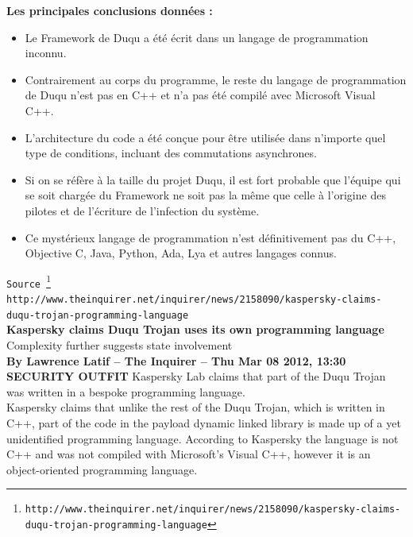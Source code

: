 \documentclass[11pt,twoside,a4paper]{article}
\begin{document}
\textbf{Les principales conclusions donn{\'e}es :}
\begin{itemize}
	\small
	\item Le Framework de Duqu a {\'e}t{\'e} {\'e}crit dans un langage de programmation inconnu.
	\item Contrairement  au corps du programme, le reste du langage de programmation de Duqu n'est pas en C++ et n'a pas {\'e}t{\'e} compil{\'e} avec Microsoft Visual C++.
	\item L'architecture du code a {\'e}t{\'e} con\c{c}ue pour {\^e}tre utilis{\'e}e dans n'importe quel type de conditions, incluant des commutations asynchrones.
	\item Si on se r{\'e}f{\`e}re {\`a} la taille du projet Duqu, il est fort probable que l'{\'e}quipe qui se soit charg{\'e}e du Framework ne soit pas la m{\^e}me que celle {\`a} l'origine des pilotes et de l'{\'e}criture de l'infection du syst{\`e}me.
	\item Ce myst{\'e}rieux langage de programmation n'est d{\'e}finitivement pas du C++, Objective C, Java, Python, Ada, Lya et autres langages connus.
\end{itemize}

\texttt{Source~\footnote{\texttt{http://www.theinquirer.net/inquirer/news/2158090/kaspersky-claims-duqu-trojan-programming-language}}}~\\


\texttt{http://www.theinquirer.net/inquirer/news/2158090/kaspersky-claims-duqu-trojan-programming-language}~\\

\textbf{\LARGE Kaspersky claims Duqu Trojan uses its own programming language}~\\

Complexity further suggests state involvement~\\

\textbf{\small By Lawrence Latif -- The Inquirer -- Thu Mar 08 2012, 13:30}~\\

\textbf{SECURITY OUTFIT} Kaspersky Lab claims that part of the Duqu Trojan was written in a bespoke programming language.~\\

Kaspersky claims that unlike the rest of the Duqu Trojan, which is written in C++, part of the code in the payload dynamic linked library is made up of a yet unidentified programming language. According to Kaspersky the language is not C++ and was not compiled with Microsoft's Visual C++, however it is an object-oriented programming language.~\\
\end{document}
